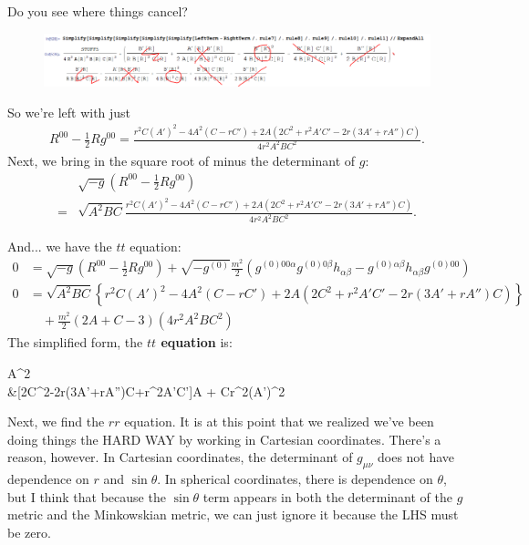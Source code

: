 \documentclass{book}
\theoremstyle{definition}
\newcommand*\widefbox[1]{\fbox{\hspace{2em}#1\hspace{2em}}}
\newcommand{\nn}{\nonumber}
\newcommand{\al}{\alpha}
\newcommand{\be}{\beta}
\newcommand{\f}[2]{\frac{#1}{#2}}
\newcommand{\lp}{\left(}
\newcommand{\rp}{\right)}
\newcommand{\lc}{\left\{}
\newcommand{\rc}{\right\}}
\begin{document}
Do you see where things cancel? \\
\begin{figure}[!htb]
	\centering
	\includegraphics[scale=0.3]{outputtt}
\end{figure}




So we're left with just
\begin{align}
R^{00} - \f{1}{2}Rg^{00} = \f{r^2C(A')^2 - 4A^2(C-rC') + 2A\lp 2C^2+r^2A'C'-2r(3A'+rA'')C \rp}{4r^2A^2BC^2}.
\end{align}
Next, we bring in the square root of minus the determinant of $g$:
\begin{align}
&\sqrt{-g}\lp R^{00} - \f{1}{2}Rg^{00} \rp \nn\\
= &\sqrt{A^2BC} \f{r^2C(A')^2 - 4A^2(C-rC') + 2A\lp 2C^2+r^2A'C'-2r(3A'+rA'')C \rp}{4r^2A^2BC^2}.
\end{align}

And... we have the $tt$ equation:
\begin{align}
0 &= \sqrt{-g}\lp R^{00} - \f{1}{2}Rg^{00} \rp + \sqrt{-g^{(0)}}\f{m^2}{2}\lp g^{(0)00\al}g^{(0)0\be}h_{\al\be} - g^{(0)\al\be}h_{\al\be}g^{(0)00} \rp \nn\\
0 &= \sqrt{A^2BC}\lc{r^2C(A')^2 - 4A^2(C-rC') + 2A\lp 2C^2+r^2A'C'-2r(3A'+rA'')C \rp}\rc\nn\\
&\quad  + \f{m^2}{2}\lp  2A + C - 3\rp(4r^2A^2BC^2)
\end{align}
The simplified form, the \textbf{$tt$ equation} is:
\begin{empheq}[box=\widefbox]{align}
0 &=  4BC^2m^2r^2A^3 + [2B(C-3)C^2m^2r^2 - 4\sqrt{A^2BC}(C-rC')]A^2 \nn\\
&\quad{}[2C^2-2r(3A'+rA'')C+r^2A'C']A + Cr^2(A')^2
\end{empheq}

Next, we find the $rr$ equation. It is at this point that we realized we've been doing things the HARD WAY by working in Cartesian coordinates. There's a reason, however. In Cartesian coordinates, the determinant of $g_{\mu\nu}$ does not have dependence on $r$ and $\sin\theta$. In spherical coordinates, there is dependence on $\theta$, but I think that because the $\sin\theta$ term appears in both the determinant of the $g$ metric and the Minkowskian metric, we can just ignore it because the LHS must be zero.\\
\end{document}
